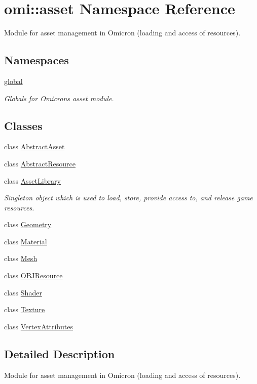 \hypertarget{namespaceomi_1_1asset}{}\section{omi\+:\+:asset Namespace Reference}
\label{namespaceomi_1_1asset}


Module for asset management in Omicron (loading and access of resources).  


\subsection*{Namespaces}
\begin{DoxyCompactItemize}
\item 
 \hyperlink{namespaceomi_1_1asset_1_1global}{global}
\begin{DoxyCompactList}\small\item\em Globals for Omicron\textquotesingle{}s asset module. \end{DoxyCompactList}\end{DoxyCompactItemize}
\subsection*{Classes}
\begin{DoxyCompactItemize}
\item 
class \hyperlink{classomi_1_1asset_1_1_abstract_asset}{Abstract\+Asset}
\item 
class \hyperlink{classomi_1_1asset_1_1_abstract_resource}{Abstract\+Resource}
\item 
class \hyperlink{classomi_1_1asset_1_1_asset_library}{Asset\+Library}
\begin{DoxyCompactList}\small\item\em Singleton object which is used to load, store, provide access to, and release game resources. \end{DoxyCompactList}\item 
class \hyperlink{classomi_1_1asset_1_1_geometry}{Geometry}
\item 
class \hyperlink{classomi_1_1asset_1_1_material}{Material}
\item 
class \hyperlink{classomi_1_1asset_1_1_mesh}{Mesh}
\item 
class \hyperlink{classomi_1_1asset_1_1_o_b_j_resource}{O\+B\+J\+Resource}
\item 
class \hyperlink{classomi_1_1asset_1_1_shader}{Shader}
\item 
class \hyperlink{classomi_1_1asset_1_1_texture}{Texture}
\item 
class \hyperlink{classomi_1_1asset_1_1_vertex_attributes}{Vertex\+Attributes}
\end{DoxyCompactItemize}


\subsection{Detailed Description}
Module for asset management in Omicron (loading and access of resources). 